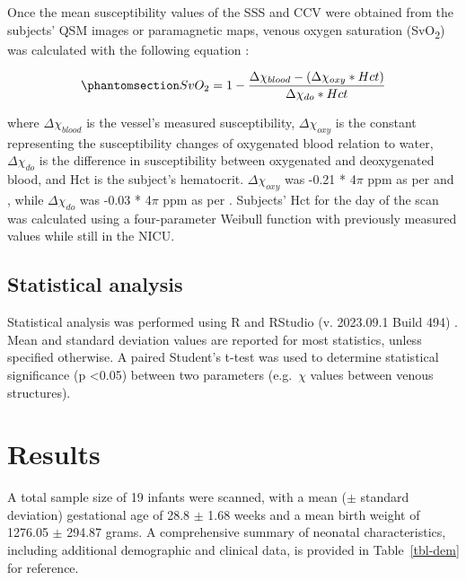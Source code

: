 \documentclass[
true
]{sn-jnl}
\begin{document}
Once the mean susceptibility values of the SSS and CCV were obtained
from the subjects' QSM images or paramagnetic maps, venous oxygen
saturation (SvO\textsubscript{2}) was calculated with the following
equation \citep{bergInvestigatingEffectFlow2021}:

\begin{equation}\phantomsection\label{eq-svo}{
SvO_{2} = 1 - \frac{\Delta \chi _{blood} - (\Delta \chi _{oxy} * Hct)}{\Delta \chi _{do} * Hct}
}\end{equation}

where \(\Delta \chi _{blood}\) is the vessel's measured susceptibility,
\(\Delta \chi _{oxy}\) is the constant representing the susceptibility
changes of oxygenated blood relation to water, \(\Delta \chi _{do}\) is
the difference in susceptibility between oxygenated and deoxygenated
blood, and Hct is the subject's hematocrit. \(\Delta \chi _{oxy}\) was
-0.21 * 4\(\pi\) ppm as per \citet{portnoyHumanUmbilicalCord2018} and
\citep{sedlacikObtainingBloodOxygenation2007}, while
\(\Delta \chi _{do}\) was -0.03 * 4\(\pi\) ppm as per
\citep{weisskoffMRISusceptometryImagebased1992}. Subjects' Hct for the
day of the scan was calculated using a four-parameter Weibull function
with previously measured values while still in the NICU.

\subsection{Statistical analysis}\label{statistical-analysis}

Statistical analysis was performed using R and RStudio (v. 2023.09.1
Build 494)
\citep{rcoreteamLanguageEnvironmentStatistical2022, rstudioteamRStudioIntegratedDevelopment}.
Mean and standard deviation values are reported for most statistics,
unless specified otherwise. A paired Student's t-test was used to
determine statistical significance (p \textless0.05) between two
parameters (e.g.~\(\chi\) values between venous structures).

\section{Results}\label{sec-results}

A total sample size of 19 infants were scanned, with a mean (\(\pm\)
standard deviation) gestational age of 28.8 \(\pm\) 1.68 weeks and a
mean birth weight of 1276.05 \(\pm\) 294.87 grams. A comprehensive
summary of neonatal characteristics, including additional demographic
and clinical data, is provided in Table~\ref{tbl-dem} for reference.
\end{document}
